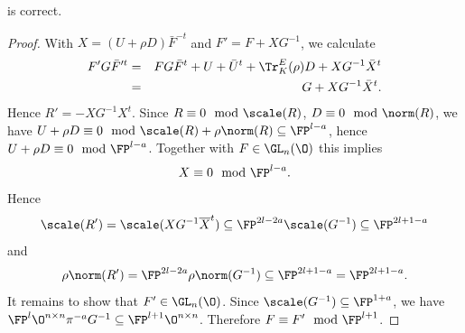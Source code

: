\begin{theorem}
 is correct.
\end{theorem}
\begin{proof}
 With $X=(U + \rho D)\bar F^{-t}$ and $F' = F + XG^{-1}$, we calculate
 \begin{eqnarray*}
 F' G \bar F'^t%
 &=& F G \bar F^t + U + \bar U^t + \Tr^E_K(\rho)D + XG^{-1} \bar X^t\\
 &= & G + X G^{-1} \bar X^t.
 \end{eqnarray*}
  Hence $R' = -XG^{-1}X^t$.
Since $R \equiv 0 \mod \scale(R)$, $D\equiv 0 \mod \norm(R)$, we have
  $U + \rho D \equiv 0 \mod \scale(R)+\rho \norm(R) \subseteq \FP^{l-a}$, hence $U + \rho D \equiv 0 \mod  \FP^{l-a}$. Together with $F \in \GL_n(\O)$ this implies
\[X \equiv 0 \mod \FP^{l-a}.\]
Hence
\[\scale(R')=\scale(X G^{-1} \overline{X}^t) \subseteq \FP^{2l-2a}\scale(G^{-1})\subseteq\FP^{2l+1-a}\]
and
\[\rho \norm(R') = \FP^{2l-2a}\rho\norm(G^{-1})\subseteq\FP^{2l+1-a}=\FP^{2l+1-a}.\]
It remains to show that $F' \in \GL_n(\O)$.
Since $\scale(G^{-1})\subseteq \FP^{1+a}$, we have $\FP^l \O^{n \times n} \pi^{-a}G^{-1} \subseteq \FP^{l+1}\O^{n \times n}$. Therefore $F \equiv F' \mod \FP^{l+1}$.
\end{proof}

